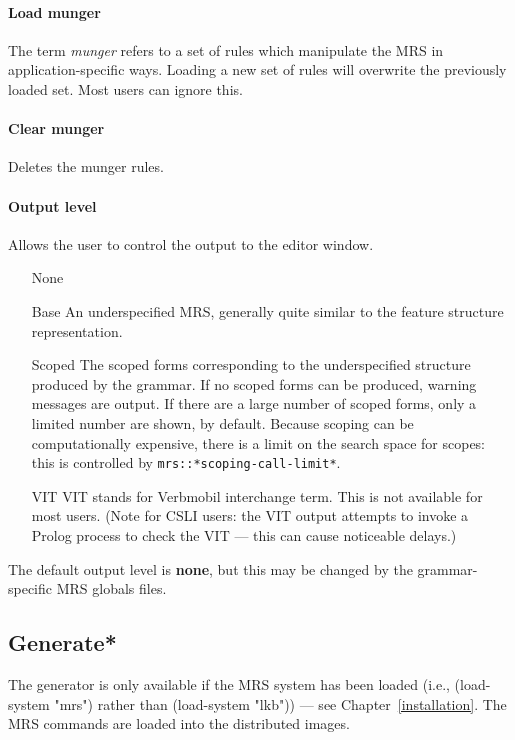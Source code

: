 \documentclass[12pt]{report}
\newcommand{\lkbparam}[1]{{\tt #1}}
\newcommand{\newterm}[1]{{\it #1}}
\begin{document}
\paragraph{Load munger} 

The term \newterm{munger} refers to a set of rules which
manipulate the MRS in application-specific ways.  
Loading a new set of rules will overwrite the previously loaded set.
Most users can ignore this.

\paragraph{Clear munger}

Deletes the munger rules.  

\paragraph{Output level}

Allows the user to control the output to the editor window. 
\begin{enumerate}
\item[None]
\item[Base]  An underspecified MRS, generally quite similar to
the feature structure representation.
\item[Scoped] The scoped forms corresponding to the
underspecified structure produced by the grammar.
If no scoped forms can be produced, warning messages
are output.  If there are a large number of scoped forms, only a limited number
are shown, by default.  Because scoping can be computationally
expensive, there is a limit on the search space for scopes: this
is controlled by \lkbparam{mrs::*scoping-call-limit*}.
\item[VIT] VIT stands for Verbmobil interchange term.  This is 
not available for most users. (Note for CSLI users: the VIT output 
attempts to invoke a Prolog process to check the VIT --- 
this can cause noticeable
delays.)
\end{enumerate}
 The default output level is {\bf none}, but this may be changed by
the grammar-specific MRS globals files.


\subsection{Generate*}
\label{gencommands}

The generator is only available if the MRS system has been loaded
(i.e., (load-system "mrs") rather than (load-system "lkb")) --- see
Chapter~\ref{installation}.  The MRS commands are loaded into the distributed
images.
\end{document}
